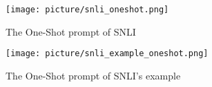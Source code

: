 

\begin{figure}[!ht]
\centering
\vspace{0.1in}
\texttt{[image: picture/snli\_oneshot.png]}
\vspace{0.1in}
\caption{The One-Shot prompt of SNLI}
\label{fig:oneshot_snli}
\vspace{0.1in}
\end{figure}

\begin{figure}[!ht]
\centering
\vspace{0.1in}
\texttt{[image: picture/snli\_example\_oneshot.png]}
\vspace{0.1in}
\caption{The One-Shot prompt of SNLI's example}
\label{fig:oneshot_snli_e}
\vspace{0.1in}
\end{figure}



